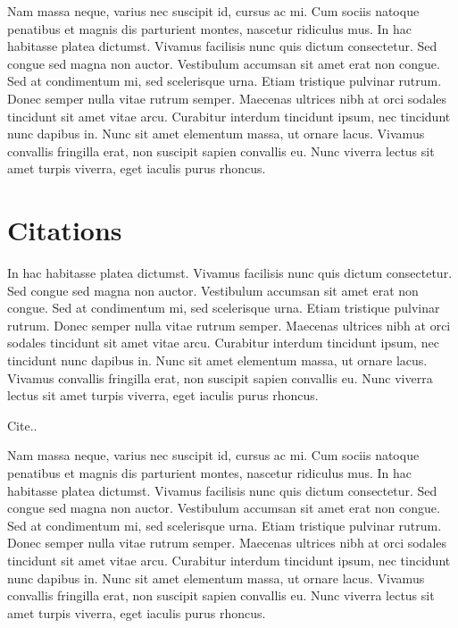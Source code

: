 Nam massa neque, varius nec suscipit id, cursus ac mi. Cum sociis natoque penatibus et magnis dis parturient montes, nascetur ridiculus mus. In hac habitasse platea dictumst. Vivamus facilisis nunc quis dictum consectetur. Sed congue sed magna non auctor. Vestibulum accumsan sit amet erat non congue. Sed at condimentum mi, sed scelerisque urna. Etiam tristique pulvinar rutrum. Donec semper nulla vitae rutrum semper. Maecenas ultrices nibh at orci sodales tincidunt sit amet vitae arcu. Curabitur interdum tincidunt ipsum, nec tincidunt nunc dapibus in. Nunc sit amet elementum massa, ut ornare lacus. Vivamus convallis fringilla erat, non suscipit sapien convallis eu. Nunc viverra lectus sit amet turpis viverra, eget iaculis purus rhoncus.

\section{Citations}

In hac habitasse platea dictumst. Vivamus facilisis nunc quis dictum consectetur. Sed congue sed magna non auctor. Vestibulum accumsan sit amet erat non congue. Sed at condimentum mi, sed scelerisque urna. Etiam tristique pulvinar rutrum. Donec semper nulla vitae rutrum semper. Maecenas ultrices nibh at orci sodales tincidunt sit amet vitae arcu. Curabitur interdum tincidunt ipsum, nec tincidunt nunc dapibus in. Nunc sit amet elementum massa, ut ornare lacus. Vivamus convallis fringilla erat, non suscipit sapien convallis eu. Nunc viverra lectus sit amet turpis viverra, eget iaculis purus rhoncus.

Cite.. \cite{Murphy16,50Shades}

Nam massa neque, varius nec suscipit id, cursus ac mi. Cum sociis natoque penatibus et magnis dis parturient montes, nascetur ridiculus mus. In hac habitasse platea dictumst. Vivamus facilisis nunc quis dictum consectetur. Sed congue sed magna non auctor. Vestibulum accumsan sit amet erat non congue. Sed at condimentum mi, sed scelerisque urna. Etiam tristique pulvinar rutrum. Donec semper nulla vitae rutrum semper. Maecenas ultrices nibh at orci sodales tincidunt sit amet vitae arcu. Curabitur interdum tincidunt ipsum, nec tincidunt nunc dapibus in. Nunc sit amet elementum massa, ut ornare lacus. Vivamus convallis fringilla erat, non suscipit sapien convallis eu. Nunc viverra lectus sit amet turpis viverra, eget iaculis purus rhoncus.